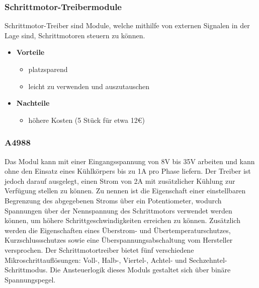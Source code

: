 \subsubsection{Schrittmotor-Treibermodule}
Schrittmotor-Treiber sind Module, welche mithilfe von externen Signalen in der Lage sind, Schrittmotoren steuern zu können.

\begin{itemize}
    \item \textbf{Vorteile}
    \begin{itemize}
        \item platzsparend
        \item leicht zu verwenden und auszutauschen
    \end{itemize}
    \item \textbf{Nachteile}
    \begin{itemize}
        \item höhere Kosten (5 Stück für etwa 12€)
    \end{itemize}
\end{itemize}

\subsubsection{A4988}
Das Modul kann mit einer Eingangsspannung von 8V bis 35V arbeiten und kann ohne den Einsatz eines Kühlkörpers bis zu 1A pro Phase liefern.
Der Treiber ist jedoch darauf ausgelegt, einen Strom von 2A mit zusätzlicher Kühlung zur Verfügung stellen zu können.
Zu nennen ist die Eigenschaft einer einstellbaren Begrenzung des abgegebenen Stroms über ein Potentiometer,
wodurch Spannungen über der Nennspannung des Schrittmotors verwendet werden können, um höhere Schrittgeschwindigkeiten erreichen zu können.
Zusätzlich werden die Eigenschaften eines Überstrom- und Übertemperaturschutzes, Kurzschlussschutzes sowie eine Überspannungsabschaltung vom Hersteller versprochen.
Der Schrittmotortreiber bietet fünf verschiedene Mikroschrittauflösungen: Voll-, Halb-, Viertel-, Achtel- und Sechzehntel-Schrittmodus.
Die Ansteuerlogik dieses Moduls gestaltet sich über binäre Spannungspegel.

